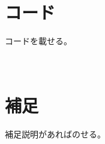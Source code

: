 \documentclass[a4paper,12pt]{jsarticle}
\begin{document}




\newpage
\appendix
\def\thesection{付録}
\section{\\コード}


コードを載せる。

\newpage
\section{\\補足}

補足説明があればのせる。
\end{document}

